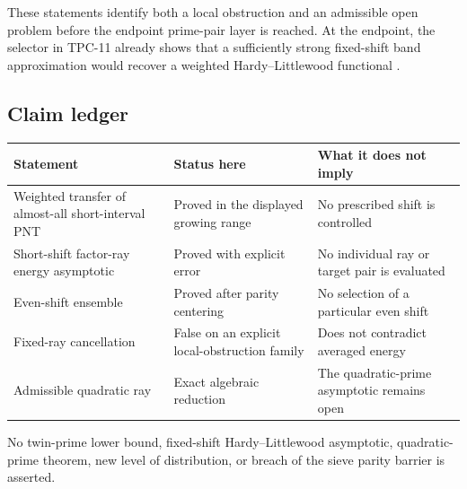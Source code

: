 These statements identify both a local obstruction and an admissible open
problem before the endpoint prime-pair layer is reached.  At the endpoint,
the selector in TPC-11 already shows that a sufficiently strong
fixed-shift band approximation would recover a weighted Hardy--Littlewood
functional \citep{HardyLittlewood1923,WangTPC11}.

\subsection{Claim ledger}

\begin{center}
\begin{tabular}{@{}p{}p{}p{}@{}}
\toprule
Statement & Status here & What it does not imply\\
\midrule
Weighted transfer of almost-all short-interval PNT
 & Proved in the displayed growing range
 & No prescribed shift is controlled\\
Short-shift factor-ray energy asymptotic
 & Proved with explicit error
 & No individual ray or target pair is evaluated\\
Even-shift ensemble
 & Proved after parity centering
 & No selection of a particular even shift\\
Fixed-ray cancellation
 & False on an explicit local-obstruction family
 & Does not contradict averaged energy\\
Admissible quadratic ray
 & Exact algebraic reduction
 & The quadratic-prime asymptotic remains open\\
\bottomrule
\end{tabular}
\end{center}

No twin-prime lower bound, fixed-shift Hardy--Littlewood asymptotic,
quadratic-prime theorem, new level of distribution, or breach of the
sieve parity barrier is asserted.
